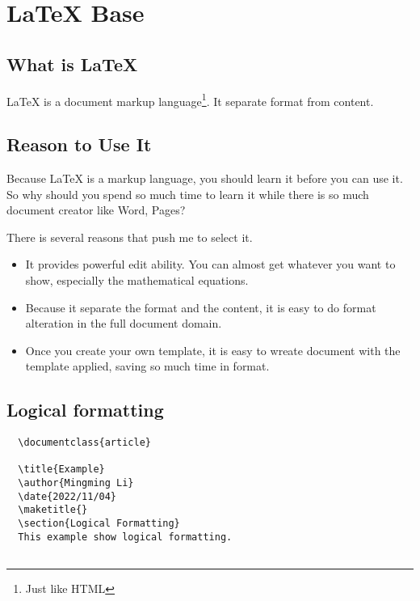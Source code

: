 

\chapter{\LaTeX\xspace Base}


\section{What is \LaTeX}
\label{sec:what-latex}

\LaTeX{} is a document markup language\footnote{Just like HTML}. It separate format from content.

\section{Reason to Use It}


Because \LaTeX \xspace{} is a markup language, you should learn it before you can use it.
So why should you spend so much time to learn it while there is so much document creator like Word, Pages?

There is several reasons that push me to select it.
\begin{itemize}
\item It provides powerful edit ability. You can almost get whatever you want to show, especially the mathematical equations.
\item Because it separate the format and the content, it is easy to do format alteration in the full document domain.
\item Once you create your own template, it is easy to wreate document with the template applied, saving so much time in format. 
\end{itemize}



\section{Logical formatting}
\lstset{language=TeX}
\begin{lstlisting}
  \documentclass{article}
  
  \title{Example}
  \author{Mingming Li}
  \date{2022/11/04}
  \maketitle{}
  \section{Logical Formatting}
  This example show logical formatting.
  
\end{lstlisting}

